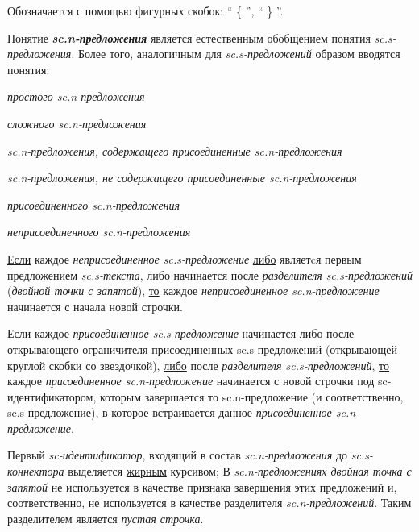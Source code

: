 \begin{SCn}
\end{SCn}

Обозначается с помощью фигурных скобок: `` \{ '', `` \} ''.

Понятие \textbf{\textit{sc.n-предложения}} является естественным обобщением понятия \textit{sc.s-предложения}. Более того, аналогичным для \textit{sc.s-предложений} образом вводятся понятия:
\begin{textitemize}
	\item \textit{простого sc.n-предложения}
	\item \textit{сложного sc.n-предложения}
	\item \textit{sc.n-предложения, содержащего присоединенные sc.n-предложения}
	\item \textit{sc.n-предложения, не содержащего присоединенные sc.n-предложения}
	\item \textit{присоединенного sc.n-предложения}
	\item \textit{неприсоединенного sc.n-предложения}
\end{textitemize}

\uline{Если} каждое \textit{неприсоединенное sc.s-предложение} \uline{либо} являетcя первым предложением \textit{sc.s-текста}, \uline{либо} начинается после \textit{разделителя sc.s-предложений} (\textit{двойной точки с запятой}), \uline{то} каждое \textit{неприсоединенное sc.n-предложение} начинается с начала новой строчки.

\uline{Если} каждое \textit{присоединенное sc.s-предложение} начинается либо после открывающего ограничителя присоединенных sc.s-предложений (открывающей круглой скобки со звездочкой), \uline{либо} после \textit{разделителя sc.s-предложений}, \uline{то} каждое \textit{присоединенное sc.n-предложение} начинается с новой строчки под sc-идентификатором, которым завершается то sc.n-предложение (и соответственно, sc.s-предложение), в которое встраивается данное \textit{присоединенное sc.n-предложение}.

Первый \textit{sc-идентификатор}, входящий в состав \textit{sc.n-предложения} до \textit{sc.s-коннектора} выделяется \uline{жирным} курсивом;
В \textit{sc.n-предложениях двойная точка с запятой} не используется в качестве признака завершения этих предложений и, соответственно, не используется в качестве разделителя \textit{sc.n-предложений}. Таким разделителем является \textit{пустая строчка}.

